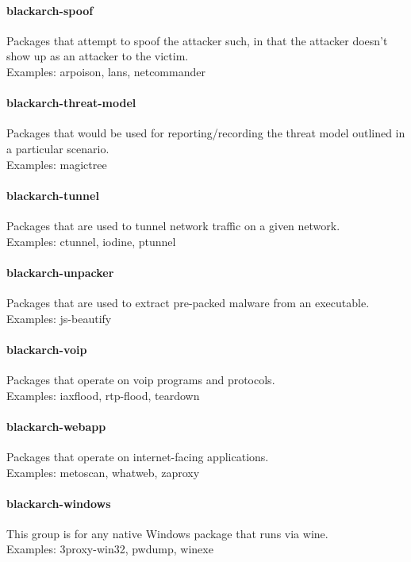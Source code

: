 \documentclass[a4paper, oneside,12pt]{scrartcl}
\begin{document}
\paragraph{blackarch-spoof}
Packages that attempt to spoof the attacker such, in that
the attacker doesn't show up as an attacker to the victim.
\\
Examples: arpoison, lans, netcommander

\paragraph{blackarch-threat-model}
Packages that would be used for reporting/recording the
threat model outlined in a particular scenario.
\\
Examples: magictree

\paragraph{blackarch-tunnel}
Packages that are used to tunnel network traffic on a given
network.
\\
Examples: ctunnel, iodine, ptunnel

\paragraph{blackarch-unpacker}
Packages that are used to extract pre-packed malware from an
executable.
\\
Examples: js-beautify

\paragraph{blackarch-voip}
Packages that operate on voip programs and protocols.
\\
Examples: iaxflood, rtp-flood, teardown

\paragraph{blackarch-webapp}
Packages that operate on internet-facing applications.
\\
Examples: metoscan, whatweb, zaproxy

\paragraph{blackarch-windows}
This group is for any native Windows package that runs via wine.
\\
Examples: 3proxy-win32, pwdump, winexe
\end{document}
